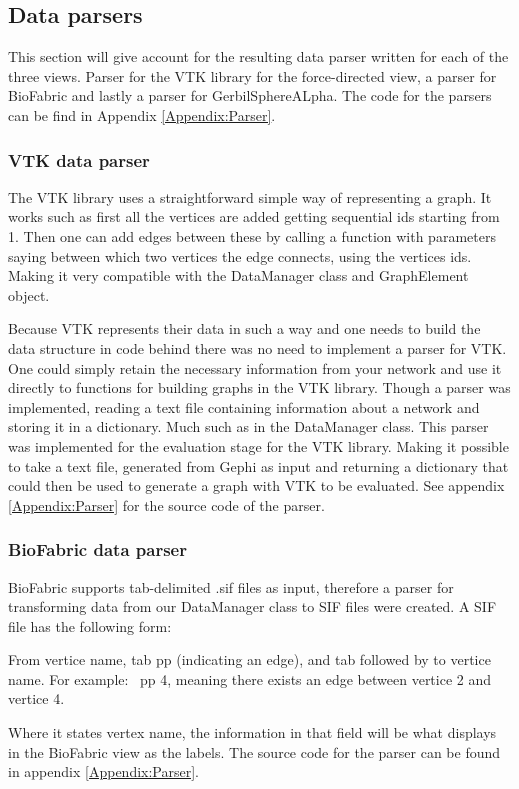 \documentclass[a4paper,11pt]{kth-mag}
\begin{document}
\begin{appendices}
\subsection{Data parsers}
\label{Data:Parsers}
This section will give account for the resulting data parser written for each of the three views. Parser for the VTK library for the force-directed view, a parser for BioFabric and lastly a parser for GerbilSphereALpha.
 The code for the parsers can be find in Appendix \ref{Appendix:Parser}.
\label{section-parsers}
\subsubsection{VTK data parser}
The VTK library uses a straightforward simple way of representing a graph. It works such as first all the vertices are added getting sequential ids starting from 1. Then one can add edges between these by calling a function with parameters
saying between which two vertices the edge connects, using the vertices ids. Making it very compatible with the DataManager class and GraphElement object.

Because VTK represents their data in such a way and one needs to build the data structure in code behind there was no need to implement a parser for VTK. One could simply retain the necessary information from your network
 and use it directly to functions for building graphs in the VTK library. Though a parser was implemented, reading a text file containing information about a network and storing it in a
 dictionary. Much such as in the DataManager class. This parser was implemented for the evaluation stage for the VTK library. Making it possible to take a text file, generated from Gephi as input and returning a 
 dictionary that could then be used to generate a graph with VTK to be evaluated. See appendix \ref{Appendix:Parser} for the source code of the parser.
\subsubsection{BioFabric data parser}
BioFabric supports tab-delimited .sif files \cite{website:biosif} as input, therefore a parser for transforming data from our DataManager class to SIF files were created. A SIF file has the following form:\
\newline
\begin{itemize}
 From vertice name, tab pp (indicating an edge), and tab followed by to vertice name. For example:\
 \newline
 2	pp	4,
\newline
 meaning there exists an edge between vertice 2 and vertice 4.
 \end{itemize}
 \newline
 Where it states vertex name, the information in that field will be what displays in the BioFabric view as the labels. The source code for the parser can be found in appendix \ref{Appendix:Parser}.

\end{appendices}
\end{document}
